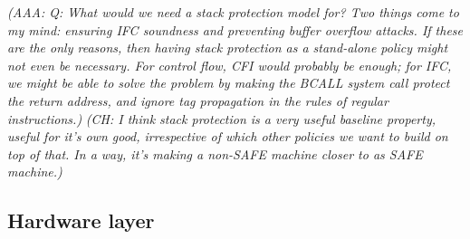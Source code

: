 \documentclass{article}
\newcommand{\ch}[1]{{\color{dkblue}\em (CH: #1)}}
\newcommand{\aaa}[1]{{\color{dkgreen}\em (AAA: #1)}}
\begin{document}
\aaa{Q: What would we need a stack protection model for? Two things
  come to my mind: ensuring IFC soundness and preventing buffer
  overflow attacks. If these are the only reasons, then having stack
  protection as a stand-alone policy might not even be necessary. For
  control flow, CFI would probably be enough; for IFC, we might be
  able to solve the problem by making the BCALL system call protect
  the return address, and ignore tag propagation in the rules of
  regular instructions.}
\ch{I think stack protection is a very useful baseline property,
  useful for it's own good, irrespective of which other policies we
  want to build on top of that. In a way, it's making a non-SAFE
  machine closer to as SAFE machine.}

\subsection{Hardware layer}
\end{document}
